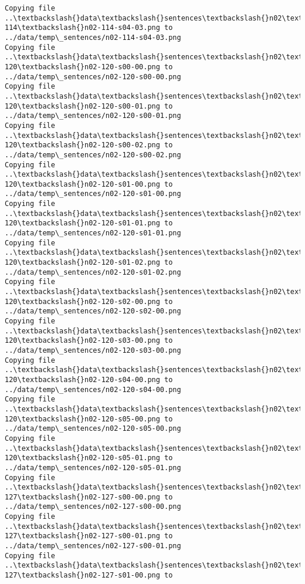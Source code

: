 \documentclass[11pt]{article}
\begin{document}
\begin{Verbatim}[commandchars=\\\{\}]
Copying file ..\textbackslash{}data\textbackslash{}sentences\textbackslash{}n02\textbackslash{}n02-114\textbackslash{}n02-114-s04-03.png to
../data/temp\_sentences/n02-114-s04-03.png
Copying file ..\textbackslash{}data\textbackslash{}sentences\textbackslash{}n02\textbackslash{}n02-120\textbackslash{}n02-120-s00-00.png to
../data/temp\_sentences/n02-120-s00-00.png
Copying file ..\textbackslash{}data\textbackslash{}sentences\textbackslash{}n02\textbackslash{}n02-120\textbackslash{}n02-120-s00-01.png to
../data/temp\_sentences/n02-120-s00-01.png
Copying file ..\textbackslash{}data\textbackslash{}sentences\textbackslash{}n02\textbackslash{}n02-120\textbackslash{}n02-120-s00-02.png to
../data/temp\_sentences/n02-120-s00-02.png
Copying file ..\textbackslash{}data\textbackslash{}sentences\textbackslash{}n02\textbackslash{}n02-120\textbackslash{}n02-120-s01-00.png to
../data/temp\_sentences/n02-120-s01-00.png
Copying file ..\textbackslash{}data\textbackslash{}sentences\textbackslash{}n02\textbackslash{}n02-120\textbackslash{}n02-120-s01-01.png to
../data/temp\_sentences/n02-120-s01-01.png
Copying file ..\textbackslash{}data\textbackslash{}sentences\textbackslash{}n02\textbackslash{}n02-120\textbackslash{}n02-120-s01-02.png to
../data/temp\_sentences/n02-120-s01-02.png
Copying file ..\textbackslash{}data\textbackslash{}sentences\textbackslash{}n02\textbackslash{}n02-120\textbackslash{}n02-120-s02-00.png to
../data/temp\_sentences/n02-120-s02-00.png
Copying file ..\textbackslash{}data\textbackslash{}sentences\textbackslash{}n02\textbackslash{}n02-120\textbackslash{}n02-120-s03-00.png to
../data/temp\_sentences/n02-120-s03-00.png
Copying file ..\textbackslash{}data\textbackslash{}sentences\textbackslash{}n02\textbackslash{}n02-120\textbackslash{}n02-120-s04-00.png to
../data/temp\_sentences/n02-120-s04-00.png
Copying file ..\textbackslash{}data\textbackslash{}sentences\textbackslash{}n02\textbackslash{}n02-120\textbackslash{}n02-120-s05-00.png to
../data/temp\_sentences/n02-120-s05-00.png
Copying file ..\textbackslash{}data\textbackslash{}sentences\textbackslash{}n02\textbackslash{}n02-120\textbackslash{}n02-120-s05-01.png to
../data/temp\_sentences/n02-120-s05-01.png
Copying file ..\textbackslash{}data\textbackslash{}sentences\textbackslash{}n02\textbackslash{}n02-127\textbackslash{}n02-127-s00-00.png to
../data/temp\_sentences/n02-127-s00-00.png
Copying file ..\textbackslash{}data\textbackslash{}sentences\textbackslash{}n02\textbackslash{}n02-127\textbackslash{}n02-127-s00-01.png to
../data/temp\_sentences/n02-127-s00-01.png
Copying file ..\textbackslash{}data\textbackslash{}sentences\textbackslash{}n02\textbackslash{}n02-127\textbackslash{}n02-127-s01-00.png to

\end{Verbatim}
\end{document}
